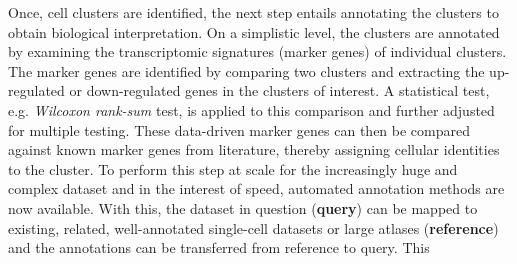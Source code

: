 \par Once, cell clusters are identified, the next step entails annotating the clusters to obtain biological interpretation. %
On a simplistic level, the clusters are annotated by examining the transcriptomic signatures (marker genes) of individual clusters. The marker genes are identified by comparing two clusters and extracting the up-regulated or down-regulated genes in the clusters of interest. A statistical test, e.g. \textit{Wilcoxon rank-sum} test, is applied to this comparison and further adjusted for multiple testing.  %
These data-driven marker genes can then be compared against known marker genes from literature, thereby assigning cellular identities to the cluster. To perform this step at scale for the increasingly huge and complex dataset and in the interest of speed, automated annotation methods are now available. With this, the dataset in question (\textbf{query}) can be mapped to existing, related, well-annotated single-cell datasets or large atlases (\textbf{reference}) and the annotations can be transferred from reference to query. This 

